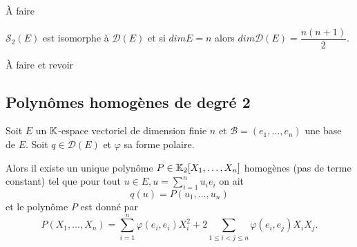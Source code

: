 \documentclass[a4paper, 12pt]{article}
\begin{document}
\begin{demonstration}
    \begin{hotwarn}
        À faire
    \end{hotwarn}
\end{demonstration}

\begin{corollaire}{}{}
    $\mathcal{S}_2(E)$ est isomorphe à $\mathcal{D}(E)$ et si $dim E = n$ alors $dim \mathcal{D}(E) = \dfrac{n(n + 1)}{2}$.
\end{corollaire}

\begin{demonstration}
    \begin{hotwarn}
        À faire et revoir
    \end{hotwarn}
\end{demonstration}

\subsection{Polynômes homogènes de degré 2}

\begin{proposition}{}{}
    Soit $E$ un $\mathbb{K}$-espace vectoriel de dimension finie $n$ et $\mathcal{B} = (e_1, \dots, e_n)$ une base de $E$.
    Soit $q \in \mathcal{D}(E)$ et $\varphi$ sa forme polaire.

    Alors il existe un unique polynôme $P \in \mathbb{K}_2[X_1, \dots, X_n]$ homogènes (pas de terme constant)
    tel que pour tout $u \in E, u = \sum\limits_{i=1}^n u_i e_i$ on ait
    $$
    q(u) = P(u_1, \dots, u_n)
    $$
    et le polynôme $P$ est donné par
    $$
    P(X_1, \dots, X_n) = \sum\limits_{i=1}^n \varphi(e_i, e_i) X_i^2 + 2 \sum\limits_{1 \leq i < j \leq n} \varphi(e_i, e_j) X_i X_j.
    $$

\end{proposition}
\end{document}
